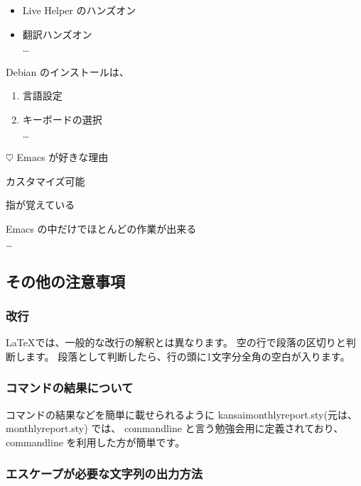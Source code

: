 \documentclass[mingoth,a4paper]{jsarticle}
\begin{document}
\begin{commandline}
\begin{itemize}
 \item Live Helper のハンズオン
 \item 翻訳ハンズオン\\
\dots{}
\end{itemize}

Debian のインストールは、
\begin{enumerate}
 \item 言語設定
 \item キーボードの選択\\
\dots{}
\end{enumerate}

\begin{list}%
 {$\heartsuit$} %
 {Emacs が好きな理由} %
 \item カスタマイズ可能
 \item 指が覚えている
 \item Emacs の中だけでほとんどの作業が出来る\\
\dots{}
\end{list}
\end{commandline}

\subsection{その他の注意事項}

\subsubsection{改行}

\LaTeX では、一般的な改行の解釈とは異なります。
空の行で段落の区切りと判断します。
段落として判断したら、行の頭に1文字分全角の空白が入ります。

\subsubsection{コマンドの結果について}

コマンドの結果などを簡単に載せられるように
kansaimonthlyreport.sty(元は、monthlyreport.sty) では、
commandline と言う勉強会用に定義されており、
commandline を利用した方が簡単です。

\subsubsection{エスケープが必要な文字列の出力方法}
\end{document}
